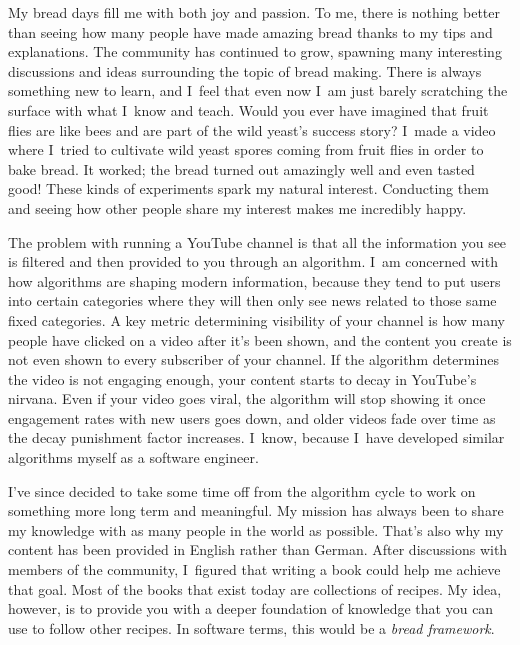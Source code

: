 My bread days fill me with both joy and passion. To me, there is nothing better than seeing
how many people have made amazing bread thanks to my tips and explanations. The community has
continued to grow, spawning many interesting discussions and ideas surrounding the topic of
bread making. There is always something new to learn, and I~feel that even now I~am just barely
scratching the surface with what I~know and teach. Would you ever have imagined that fruit
flies are like bees and are part of the wild yeast's success story? I~made a video where
I~tried to cultivate wild yeast spores coming from fruit flies in order
to bake bread. It worked; the bread turned out amazingly well and even tasted good! These kinds of
experiments spark my natural interest. Conducting them and seeing how other people share my
interest makes me incredibly happy.

The problem with running a YouTube channel is that all the information
you see is filtered and then provided to you through an algorithm. I~am concerned
with how algorithms are shaping modern information, because they tend to
put users into certain categories where they will then only see news related to
those same fixed categories. A key metric determining visibility of your channel is how many
people have clicked on a video after it's been shown, and the content you create
is not even shown to every subscriber of your channel. If the algorithm determines the video
is not engaging enough, your content starts to decay in YouTube's nirvana. Even if your video
goes viral, the algorithm will stop showing it once engagement rates with new users goes down,
and older videos fade over time as the decay punishment factor increases. I~know, because
I~have developed similar algorithms myself as a software engineer.

I've since decided to take some time off from the algorithm cycle to work on something more
long term and meaningful. My mission has always been to share my knowledge with as many people
in the world as possible. That's also why my content has been provided in English rather than
German. After discussions with members of the community, I~figured that writing a book could
help me achieve that goal. Most of the books that exist today are collections of recipes. My
idea, however, is to provide you with a deeper foundation of knowledge that you can use to
follow other recipes.
In software terms, this would be a \emph{bread framework}.

